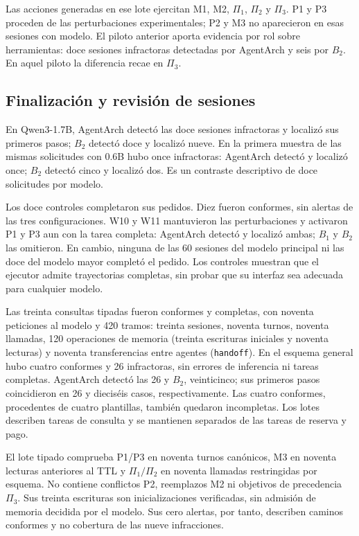 \documentclass[conference]{IEEEtran}
\begin{document}
Las acciones generadas en ese lote ejercitan M1, M2, \(\Pi_1\), \(\Pi_2\) y \(\Pi_3\). P1 y P3 proceden de las perturbaciones experimentales; P2 y M3 no aparecieron en esas sesiones con modelo. El piloto anterior aporta evidencia por rol sobre herramientas: doce sesiones infractoras detectadas por AgentArch y seis por \(B_2\). En aquel piloto la diferencia recae en \(\Pi_3\).

\subsection{Finalización y revisión de sesiones}
En Qwen3-1.7B, AgentArch detectó las doce sesiones infractoras y localizó sus primeros pasos; \(B_2\) detectó doce y localizó nueve. En la primera muestra de las mismas solicitudes con 0.6B hubo once infractoras: AgentArch detectó y localizó once; \(B_2\) detectó cinco y localizó dos. Es un contraste descriptivo de doce solicitudes por modelo.

Los doce controles completaron sus pedidos. Diez fueron conformes, sin alertas de las tres configuraciones. W10 y W11 mantuvieron las perturbaciones y activaron P1 y P3 aun con la tarea completa: AgentArch detectó y localizó ambas; \(B_1\) y \(B_2\) las omitieron. En cambio, ninguna de las 60 sesiones del modelo principal ni las doce del modelo mayor completó el pedido. Los controles muestran que el ejecutor admite trayectorias completas, sin probar que su interfaz sea adecuada para cualquier modelo.

Las treinta consultas tipadas fueron conformes y completas, con noventa peticiones al modelo y 420 tramos: treinta sesiones, noventa turnos, noventa llamadas, 120 operaciones de memoria (treinta escrituras iniciales y noventa lecturas) y noventa transferencias entre agentes (\texttt{handoff}). En el esquema general hubo cuatro conformes y 26 infractoras, sin errores de inferencia ni tareas completas. AgentArch detectó las 26 y \(B_2\), veinticinco; sus primeros pasos coincidieron en 26 y dieciséis casos, respectivamente. Las cuatro conformes, procedentes de cuatro plantillas, también quedaron incompletas. Los lotes describen tareas de consulta y se mantienen separados de las tareas de reserva y pago.

El lote tipado comprueba P1/P3 en noventa turnos canónicos, M3 en noventa lecturas anteriores al TTL y \(\Pi_1/\Pi_2\) en noventa llamadas restringidas por esquema. No contiene conflictos P2, reemplazos M2 ni objetivos de precedencia \(\Pi_3\). Sus treinta escrituras son inicializaciones verificadas, sin admisión de memoria decidida por el modelo. Sus cero alertas, por tanto, describen caminos conformes y no cobertura de las nueve infracciones.
\end{document}
